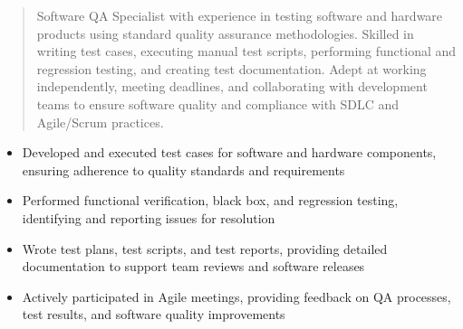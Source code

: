 



\makecvheader

\begin{quote}
  \noindent
  Software QA Specialist with experience in testing software and hardware products using standard quality assurance methodologies. Skilled in writing test cases, executing manual test scripts, performing functional and regression testing, and creating test documentation. Adept at working independently, meeting deadlines, and collaborating with development teams to ensure software quality and compliance with SDLC and Agile/Scrum practices.
\end{quote}

\par\smallskip
\noindent
\begin{minipage}{20cm}
  \begin{minipage}{9.75cm}
    \begin{itemize}
      \item Developed and executed test cases for software and hardware components, ensuring adherence to quality standards and requirements
      \item Performed functional verification, black box, and regression testing, identifying and reporting issues for resolution
    \end{itemize}
  \end{minipage}
  \hfill
  \begin{minipage}{9.75cm}
    \begin{itemize}
      \item Wrote test plans, test scripts, and test reports, providing detailed documentation to support team reviews and software releases
      \item Actively participated in Agile meetings, providing feedback on QA processes, test results, and software quality improvements
    \end{itemize}
  \end{minipage}
\end{minipage}
\par\smallskip
\divider

